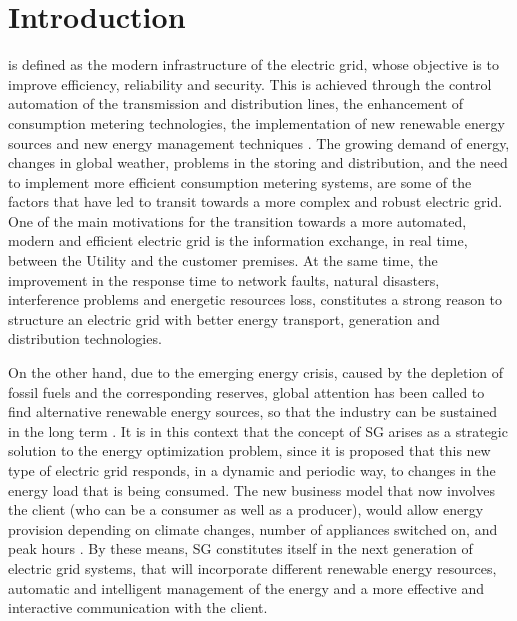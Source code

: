 \documentclass[11pt,draftclsnofoot,onecolumn]{IEEEtran}
\begin{document}
\section{Introduction}
 is defined as the modern infrastructure of the electric grid, whose objective is to improve efficiency, reliability and security. This is achieved through the control automation of the transmission and distribution lines, the enhancement of consumption metering technologies, the implementation of new renewable energy sources and new energy management techniques \cite{Gungor2011}. The growing demand of energy, changes in global weather, problems in the storing and distribution, and the need to implement more efficient consumption metering systems, are some of the factors that have led to transit towards a more complex and robust electric grid. 
One of the main motivations for the transition towards a more automated, modern and efficient electric grid is the information exchange, in real time, between the Utility and the customer premises. At the same time, the improvement in the response time to network faults, natural disasters, interference problems and energetic resources loss, constitutes a strong reason to structure an electric grid with better energy transport, generation and distribution technologies.

On the other hand, due to the emerging energy crisis, caused by the depletion of fossil fuels and the corresponding reserves, global attention has been called to find alternative renewable energy sources, so that the industry can be sustained in the long term \cite{Wang2011a}. It is in this context that the concept of SG arises as a strategic solution to the energy optimization problem, since it is proposed that this new type of electric grid responds, in a dynamic and periodic way, to changes in the energy load that is being consumed. The new business model that now involves the client (who can be a consumer as well as a producer), would allow energy provision depending on climate changes, number of appliances switched on, and peak hours \cite{Castellani2012}. By these means, SG constitutes itself in the next generation of electric grid systems, that will incorporate different renewable energy resources, automatic and intelligent management of the energy and a more effective and interactive communication with the client.
\end{document}
